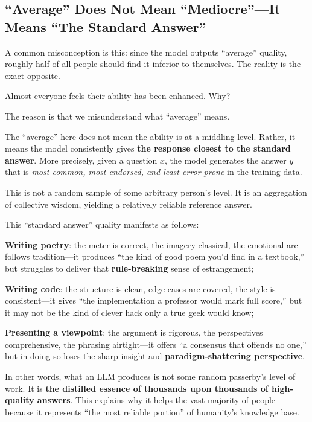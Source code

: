 \newpage
\subsection{``Average'' Does Not Mean ``Mediocre''---It Means ``The Standard Answer''}

A common misconception is this: since the model outputs ``average'' quality, roughly half of all people should find it inferior to themselves. The reality is the exact opposite.

Almost everyone feels their ability has been enhanced. Why?

\vspace{1em}

The reason is that we misunderstand what ``average'' means.

The ``average'' here does not mean the ability is at a middling level. Rather, it means the model consistently gives \textbf{the response closest to the standard answer}. More precisely, given a question $x$, the model generates the answer $y$ that is \emph{most common, most endorsed, and least error-prone} in the training data.

This is not a random sample of some arbitrary person's level. It is an aggregation of collective wisdom, yielding a relatively reliable reference answer.

\vspace{1em}

This ``standard answer'' quality manifests as follows:

\textbf{Writing poetry}: the meter is correct, the imagery classical, the emotional arc follows tradition---it produces ``the kind of good poem you'd find in a textbook,'' but struggles to deliver that \textbf{rule-breaking} sense of estrangement;

\textbf{Writing code}: the structure is clean, edge cases are covered, the style is consistent---it gives ``the implementation a professor would mark full score,'' but it may not be the kind of clever hack only a true geek would know;

\textbf{Presenting a viewpoint}: the argument is rigorous, the perspectives comprehensive, the phrasing airtight---it offers ``a consensus that offends no one,'' but in doing so loses the sharp insight and \textbf{paradigm-shattering perspective}.

\vspace{1em}

In other words, what an LLM produces is not some random passerby's level of work. It is \textbf{the distilled essence of thousands upon thousands of high-quality answers}. This explains why it helps the vast majority of people---because it represents ``the most reliable portion'' of humanity's knowledge base.

